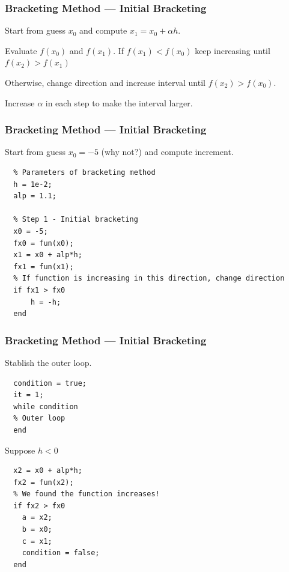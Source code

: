 \documentclass[11pt,xcolor={svgnames},aspectratio=169,usepdftitle=false]{beamer}
\let\toneitemize\itemize
\let\ttwoitemize\enditemize
\renewenvironment{itemize}{\toneitemize\addtolength{\itemsep}{0.7\baselineskip}}{\ttwoitemize}
\let\toneenumer\enumerate
\let\ttwoenumer\endenumerate
\renewenvironment{enumerate}{\toneenumer\addtolength{\itemsep}{0.7\baselineskip}}{\ttwoenumer}
\begin{document}
\begin{frame}
  \frametitle{Bracketing Method --- Initial Bracketing}
\begin{enumerate}
  \item Start from guess $x_0$ and compute $x_1 = x_0 + \alpha h$.
  \item Evaluate $f(x_0)$ and $f(x_1)$. If $f(x_1) < f(x_0)$ keep increasing until $f(x_2) > f(x_1)$
  \item Otherwise, change direction and increase interval until $f(x_2) > f(x_0)$.
  \item Increase $\alpha$ in each step to make the interval larger.
\end{enumerate}
\end{frame}

\begin{frame}[fragile]
  \frametitle{Bracketing Method --- Initial Bracketing}
\begin{itemize}
  \item Start from guess $x_0 = -5$ {\tiny (why not?)} and compute increment.
  \begin{lstlisting}
  % Parameters of bracketing method
  h = 1e-2;
  alp = 1.1;
    
  % Step 1 - Initial bracketing
  x0 = -5;
  fx0 = fun(x0);
  x1 = x0 + alp*h;
  fx1 = fun(x1);
  % If function is increasing in this direction, change direction  
  if fx1 > fx0
      h = -h;
  end
  \end{lstlisting}
\end{itemize}
\end{frame}

\begin{frame}[fragile]
  \frametitle{Bracketing Method --- Initial Bracketing}
\begin{itemize}
  \item Stablish the outer loop.
  \begin{lstlisting}
  condition = true;
  it = 1;
  while condition
  % Outer loop
  end
  \end{lstlisting}
  \item Suppose $h < 0$
  \begin{lstlisting}
  x2 = x0 + alp*h; 
  fx2 = fun(x2);
  % We found the function increases!
  if fx2 > fx0
    a = x2;
    b = x0;
    c = x1;
    condition = false;
  end
  \end{lstlisting}
\end{itemize}
\end{frame}
\end{document}
